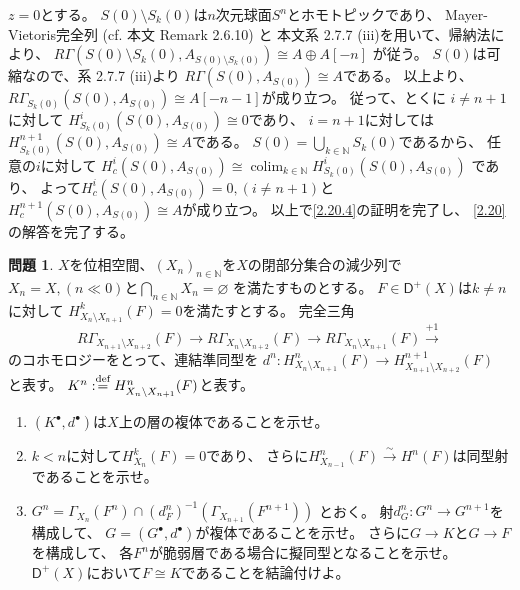 \documentclass[uplatex,dvipdfmx]{jsarticle}
\makeatletter
\theoremstyle{definition}
\newtheorem{prob}[prob]{問題}
\renewenvironment{proof}[1][\proofname]{
  \pushQED{\qed}%
  \normalfont \topsep6\p@\@plus6\p@\relax
  \trivlist
  \item[\hskip\labelsep
    #1\@addpunct{\textbf{.}}]\ignorespaces
}{%
  \popQED\endtrivlist\@endpefalse
}
\providecommand{\proofname}{証明}
\DeclareMathOperator{\colim}{\mathrm{colim}}
\newcommand{\sfD}{\mathsf{D}}
\newcommand\N{\mathbb{N}}
\renewcommand{\emptyset}{\varnothing}
\def\dfn{:\overset{\mbox{{\scriptsize def}}}{=}}
\makeatother
\begin{document}
\begin{proof}
  \(z=0\)とする。
  \(S(0)\setminus S_k(0)\)は\(n\)次元球面\(S^n\)とホモトピックであり、
  Mayer-Vietoris完全列 (cf. 本文 Remark 2.6.10) と
  本文系 2.7.7 (iii)を用いて、帰納法により、
  \(R\Gamma(S(0)\setminus S_k(0),A_{S(0)\setminus S_k(0)})\cong A\oplus A[-n]\)
  が従う。
  \(S(0)\)は可縮なので、系 2.7.7 (iii)より
  \(R\Gamma(S(0),A_{S(0)})\cong A\)である。
  以上より、\(R\Gamma_{S_k(0)}(S(0),A_{S(0)}) \cong A[-n-1]\)が成り立つ。
  従って、とくに
  \(i\neq n+1\)に対して
  \(H^i_{S_k(0)}(S(0),A_{S(0)})\cong 0\)であり、
  \(i=n+1\)に対しては\(H^{n+1}_{S_k(0)}(S(0),A_{S(0)})\cong A\)である。
  \(S(0)=\bigcup_{k\in \N}S_k(0)\)であるから、
  任意の\(i\)に対して
  \(H^i_c(S(0),A_{S(0)})\cong \colim_{k\in \N}H^i_{S_k(0)}(S(0),A_{S(0)})\)
  であり、
  よって\(H^i_c(S(0),A_{S(0)}) = 0, (i\neq n+1)\)と
  \(H^{n+1}_c(S(0),A_{S(0)}) \cong A\)が成り立つ。
  以上で\ref{2.20.4}の証明を完了し、
  \autoref{2.20}の解答を完了する。
\end{proof}









\begin{prob}\label{2.21}
  \(X\)を位相空間、\((X_n)_{n\in \N}\)を\(X\)の閉部分集合の減少列で
  \(X_n=X, (n \ll 0)\)と\(\bigcap_{n\in \N}X_n = \emptyset\)
  を満たすものとする。
  \(F\in \sfD^+(X)\)は\(k\neq n\)に対して
  \(H^k_{X_n\setminus X_{n+1}}(F)=0\)を満たすとする。
  完全三角
  \[
  R\Gamma_{X_{n+1}\setminus X_{n+2}}(F) \to
  R\Gamma_{X_n\setminus X_{n+2}}(F) \to
  R\Gamma_{X_n\setminus X_{n+1}}(F) \xrightarrow{+1}
  \]
  のコホモロジーをとって、連結準同型を
  \(d^n:H^n_{X_n\setminus X_{n+1}}(F) \to H^{n+1}_{X_{n+1}\setminus X_{n+2}}(F)\)
  と表す。
  \(K^n\dfn H^n_{X_n\setminus X_{n+1}}(F)\)と表す。
  \begin{enumerate}
    \item \label{2.21.1}
    \((K^{\bullet},d^{\bullet})\)は\(X\)上の層の複体であることを示せ。
    \item \label{2.21.2}
    \(k<n\)に対して\(H^k_{X_n}(F)=0\)であり、
    さらに\(H^n_{X_{n-1}}(F) \xrightarrow{\sim} H^n(F)\)は同型射であることを示せ。
    \item \label{2.21.3}
    \(G^n = \Gamma_{X_n}(F^n)\cap (d^n_F)^{-1}(\Gamma_{X_{n+1}}(F^{n+1}))\)
    とおく。
    射\(d_G^n:G^n\to G^{n+1}\)を構成して、
    \(G=(G^{\bullet},d^{\bullet})\)が複体であることを示せ。
    さらに\(G\to K\)と\(G\to F\)を構成して、
    各\(F^n\)が脆弱層である場合に擬同型となることを示せ。
    \(\sfD^+(X)\)において\(F\cong K\)であることを結論付けよ。
  \end{enumerate}
\end{prob}
\end{document}
